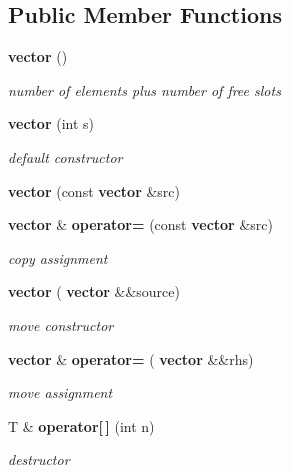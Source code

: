 \subsection*{Public Member Functions}
\begin{DoxyCompactItemize}
\item 
\mbox{\label{classmy_std_1_1vector_a40e5c01ceb5d0c2bc64b23005c21ba04}} 
\textbf{ vector} ()
\begin{DoxyCompactList}\small\item\em number of elements plus number of free slots \end{DoxyCompactList}\item 
\textbf{ vector} (int s)
\begin{DoxyCompactList}\small\item\em default constructor \end{DoxyCompactList}\item 
\mbox{\label{classmy_std_1_1vector_ae425fb0a79cfa7870cf3603c8abe3369}} 
{\bfseries vector} (const \textbf{ vector} \&src)
\item 
\mbox{\label{classmy_std_1_1vector_a5cbbf45fd8ead8b9cbf4b0c7acf5010f}} 
\textbf{ vector} \& \textbf{ operator=} (const \textbf{ vector} \&src)
\begin{DoxyCompactList}\small\item\em copy assignment \end{DoxyCompactList}\item 
\mbox{\label{classmy_std_1_1vector_a4950397cd3da431867998cd4bf1110cf}} 
\textbf{ vector} (\textbf{ vector} \&\&source)
\begin{DoxyCompactList}\small\item\em move constructor \end{DoxyCompactList}\item 
\mbox{\label{classmy_std_1_1vector_a8f9a7e6e736863e702e8c939d73e42ea}} 
\textbf{ vector} \& \textbf{ operator=} (\textbf{ vector} \&\&rhs)
\begin{DoxyCompactList}\small\item\em move assignment \end{DoxyCompactList}\item 
\mbox{\label{classmy_std_1_1vector_a7840f76cb8fdb56e3a70506c7e0fbf5a}} 
T \& \textbf{ operator[$\,$]} (int n)
\begin{DoxyCompactList}\small\item\em destructor \end{DoxyCompactList}\item 
\mbox{\label{classmy_std_1_1vector_a74f73fa926d09d684715feec8956a138}} 

\end{DoxyCompactItemize}
